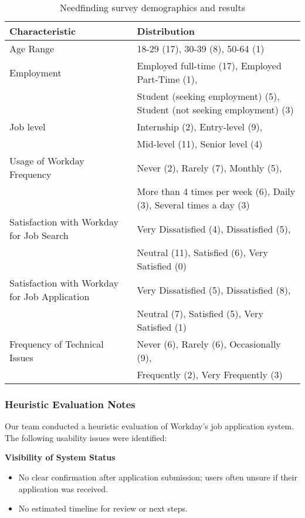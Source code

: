 \documentclass[
	letterpaper, %
]{jdf}
\begin{document}
\begin{sloppypar}
\begin{table}[h]
\centering
\renewcommand{\arraystretch}{1.3} %
\begin{tabular}{|l|p{8cm}|} %
\hline
\textbf{Characteristic} & \textbf{Distribution} \\
\hline
Age Range & 18-29 (17), 30-39 (8), 50-64 (1) \\
\hline
Employment & Employed full-time (17), Employed Part-Time (1),\\ 
& Student (seeking employment) (5), Student (not seeking employment) (3) \\
\hline
Job level & Internship (2), Entry-level (9),\\
& Mid-level (11), Senior level (4) \\
\hline
Usage of Workday Frequency & Never (2), Rarely (7), Monthly (5), \\
& More than 4 times per week (6), Daily (3), Several times a day (3) \\
\hline
Satisfaction with Workday for Job Search & Very Dissatisfied (4), Dissatisfied (5),\\
& Neutral (11), Satisfied (6), Very Satisfied (0) \\
\hline
Satisfaction with Workday for Job Application & Very Dissatisfied (5), Dissatisfied (8),\\
& Neutral (7), Satisfied (5), Very Satisfied (1) \\
\hline
Frequency of Technical Issues & Never (6), Rarely (6), Occasionally (9),\\
& Frequently (2), Very Frequently (3) \\
\hline
\end{tabular}
\caption{Needfinding survey demographics and results}
\end{table}
\hfill \break

\subsubsection*{Heuristic Evaluation Notes}  

Our team conducted a heuristic evaluation of Workday’s job application system. The following usability issues were identified:   

\textbf{Visibility of System Status}  
\begin{itemize}  
    \item No clear confirmation after application submission; users often unsure if their application was received.  
    \item No estimated timeline for review or next steps.  
\end{itemize}   


\end{sloppypar}
\end{document}
